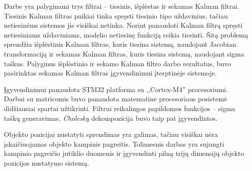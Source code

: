 Darbe yra palyginami trys filtrai -- tiesinis, išplėstas ir sekamas Kalman filtrai.
Tiesinis Kalman filtras puikiai tinka spręsti tiesinio tipo uždavinius, tačiau netiesinėms sistemos jis visiškai netinka.
Norint panaudoti Kalman filtrą spręsti netiesiniams uždaviniams, modelio netiesinę funkciją reikia tiesinti.
Šitą problemą sprendžia išplėstinis Kalman filtras, kuris tiesina sistemą, naudojant Jacobian transformaciją ir sekamas Kalman filtras, kuris tiesina sistemą, naudojant sigma taškus.
Palyginus išplėstinio ir sekamo Kalman filtro darbo rezultatus, buvo pasirinktas sekamas Kalman filtras įgyvendinimui įterptinėje sistemoje.

Įgyvendinimui panaudota STM32 platforma su ,,Cortex-M4'' procesoriumi.
Darbui su matricomis buvo panaudota matematinė procesoriaus posistemė didžiausiai spartai užtikrinti.
Filtrui reikalingos papildomos funkcijos -- sigma taškų generavimas, \textit{Cholesky} dekompozicija buvo taip pat įgyvendintos.

Objekto pozicijai nustatyti sprendimas yra galimas, tačiau visiškai nėra įskaičiuojamas objekto kampinis pagreitis.
Tolimesnis darbas yra sujungti kampinio pagreičio jutiklio duomenis ir įgyvendinti pilną trijų dimensijų objekto pozicijos nustatymo sistemą.




